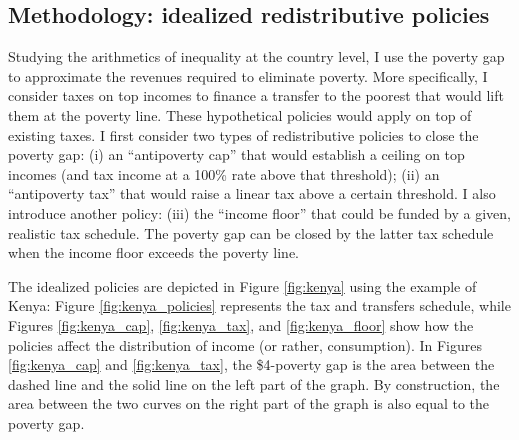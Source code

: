 \documentclass[12pt,english]{article}
\begin{document}
\subsection{Methodology: idealized redistributive policies\label{subsec:method}}

Studying the arithmetics of inequality at the country level, I use the poverty gap to approximate the revenues required to eliminate poverty. 
More specifically, I consider taxes on top incomes to finance a transfer to the poorest that would lift them at the poverty line. These hypothetical policies would apply on top of existing taxes. I first consider two types of redistributive policies to close the poverty gap: (i) an ``antipoverty cap'' that would establish a ceiling on top incomes (and tax income at a 100\% rate above that threshold); (ii) an ``antipoverty tax'' that would raise a linear tax above a certain threshold. I also introduce another policy: (iii) the ``income floor'' that could be funded by a given, realistic tax schedule. The poverty gap can be closed by the latter tax schedule when the income floor exceeds the poverty line. 

The idealized policies are depicted in Figure \ref{fig:kenya} using the example of Kenya: Figure \ref{fig:kenya_policies} represents the tax and transfers schedule, while Figures \ref{fig:kenya_cap}, \ref{fig:kenya_tax}, and \ref{fig:kenya_floor} show how the policies affect the distribution of income (or rather, consumption). In Figures \ref{fig:kenya_cap} and \ref{fig:kenya_tax}, the \$4-poverty gap is the area between the dashed line and the solid line on the left part of the graph. By construction, the area between the two curves on the right part of the graph is also equal to the poverty gap.
\end{document}

